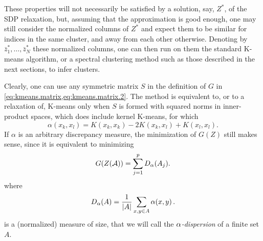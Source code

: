 These properties will not necessarily be satisfied by a
solution, say, $Z^*$, of the SDP relaxation, but, assuming that the approximation is good enough, one may still consider the  normalized columns of $Z^*$ and expect them to be similar for indices in the same cluster,  and away from each other otherwise. Denoting by $\bar z^*_1, \ldots, \bar z^*_N$ these normalized columns, one can then run on them the standard K-means algorithm, or a spectral clustering method such as those described in the next sections, to infer clusters.

\begin{remark}
\label{rem:sdp.kmeans}
Clearly, one can use any  symmetric matrix $S$ in the definition of $G$ in \cref{eq:kmeans.matrix,eq:kmeans.matrix.2}. The method is equivalent to, or to a relaxation of, K-means only when $S$ is formed with squared norms in inner-product spaces, which does include  kernel K-means, for which
\[
\alpha(x_k, x_l) = K(x_k,x_k) - 2 K(x_k,x_l) + K(x_l, x_l).
\]
If $\alpha$ is an arbitrary discrepancy measure, the minimization of $G(Z)$ still makes sense, since it is equivalent to minimizing
\[
G(Z({\mathcal A})) = \sum_{j=1}^p D_\alpha(A_j).
\]
where
\begin{equation}
\label{eq:vv.alpha}
D_\alpha(A) = \frac1{|A|} \sum_{x,y\in A} \alpha(x, y)\,.
\end{equation}
is a (normalized) measure of size, that we will call the {\em $\alpha$-dispersion} of a finite set $A$.
\end{remark}


